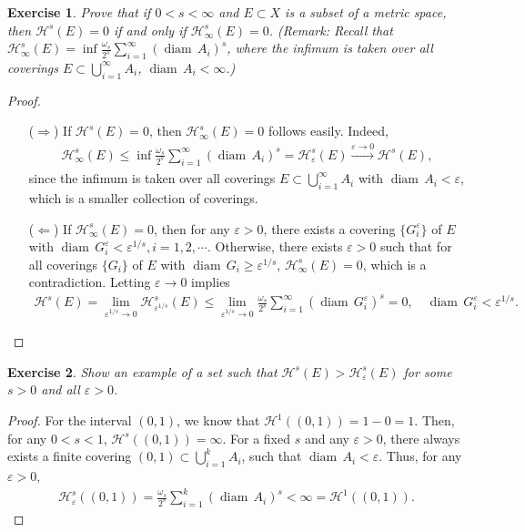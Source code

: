 \documentclass[11pt]{book}
\newtheorem{exercise}{Exercise}[section]
\theoremstyle{definition}
\numberwithin{equation}{chapter}
\def\H{{\mathcal H}}
\def\diam{{\operatorname{diam}\,}}
\begin{document}
\begin{exercise}
Prove that if $0 < s < \infty$ and $E \subset X$ is a subset of a metric space, then $\mathcal{H}^s(E) = 0$ if and only if $\mathcal{H}_\infty^s(E) = 0$. ({\em Remark}: Recall that $\mathcal{H}^s_\infty(E) = \inf \frac{\omega_s}{2^s} \sum_{i=1}^\infty (\diam A_i)^s$, where the infimum is taken over all coverings $E \subset \bigcup_{i=1}^\infty A_i$, $\diam A_i < \infty$.)
\end{exercise}
\begin{proof}
~\begin{enumerate}
    \item[($\Rightarrow$)] If $\H^s(E) = 0$, then  $\H^s_\infty(E) = 0$ follows easily. Indeed, \begin{align*}
        \H^s_\infty(E) \leq \inf \frac{\omega_s}{2^s} \sum_{i=1}^\infty (\diam A_i)^s = \H^s_\varepsilon(E) \xrightarrow[]{\varepsilon \to 0} \H^s(E),
    \end{align*}  
    since the infimum is taken over all coverings $E \subset \bigcup^\infty_{i=1} A_i$ with $\diam A_i < \varepsilon$, which is a smaller collection of coverings.
    
    \item[($\Leftarrow$)] If $\H^s_\infty(E) = 0$, then for any $\varepsilon > 0$, there exists a covering $\{G^\varepsilon_i\}$ of $E$ with $\diam G^\varepsilon_i < \varepsilon^{1/s}, i = 1,2,\cdots$. Otherwise, there exists $\varepsilon > 0$ such that for all coverings $\{G_i\}$ of $E$ with $\diam G_i \geq \varepsilon^{1/s}$, $\H^s_\infty(E) = 0$, which is a contradiction. Letting $\varepsilon \to 0$ implies
    \begin{align*}
        \H^s(E) = \lim_{\varepsilon^{1/s} \to 0}\H^s_{\varepsilon^{1/s}}(E) \leq \lim_{\varepsilon^{1/s} \to 0} \frac{\omega_s}{2^s} \sum^\infty_{i=1} (\diam G^\varepsilon_i)^s = 0, \quad \diam G^\varepsilon_i < \varepsilon^{1/s}.
    \end{align*}
\end{enumerate}
\end{proof}

\medskip

\begin{exercise}\label{exeercise_112}
Show an example of a set such that $\mathcal{H}^s(E) > \mathcal{H}^s_\varepsilon(E)$ for some $s > 0$ and all $\varepsilon > 0$.
\end{exercise}
\begin{proof}
For the interval $(0,1)$, we know that $\mathcal{H}^1((0,1)) = 1 - 0 = 1$. Then, for any $0 < s < 1$, $\mathcal{H}^s((0,1)) = \infty$. For a fixed $s$ and any $\varepsilon > 0$, there always exists a finite covering $(0,1) \subset \bigcup^k_{i=1} A_i$, such that $\diam A_i < \varepsilon$. Thus, for any $\varepsilon> 0$,
\begin{align*}
    \mathcal{H}^s_{\varepsilon}((0,1)) = \frac{\omega_s}{2^s} \sum^k_{i=1} (\diam A_i)^s < \infty = \mathcal{H}^1((0,1)).
\end{align*}
\end{proof}
\end{document}
